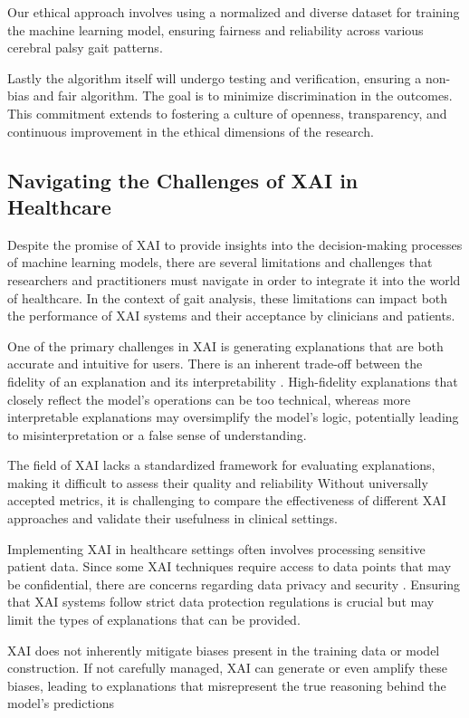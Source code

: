 \documentclass[UKenglish]{uiomasterthesis}
\begin{document}
Our ethical approach involves using a normalized and diverse dataset for training the machine learning model, ensuring fairness and reliability across various cerebral palsy gait patterns.

Lastly the algorithm itself will undergo testing and verification, ensuring a non-bias and fair algorithm. The goal is to minimize discrimination in the outcomes. This commitment extends to fostering a culture of openness, transparency, and continuous improvement in the ethical dimensions of the research.

\subsection{Navigating the Challenges of XAI in Healthcare}
Despite the promise of XAI to provide insights into the decision-making processes of machine learning models, there are several limitations and challenges that researchers and practitioners must navigate in order to integrate it into the world of healthcare. In the context of gait analysis, these limitations can impact both the performance of XAI systems and their acceptance by clinicians and patients.

One of the primary challenges in XAI is generating explanations that are both accurate and intuitive for users. There is an inherent trade-off between the fidelity of an explanation and its interpretability \cite{holzinger_causability_2019}. High-fidelity explanations that closely reflect the model's operations can be too technical, whereas more interpretable explanations may oversimplify the model's logic, potentially leading to misinterpretation or a false sense of understanding.

The field of XAI lacks a standardized framework for evaluating explanations, making it difficult to assess their quality and reliability \cite{liu_tensors_2022} Without universally accepted metrics, it is challenging to compare the effectiveness of different XAI approaches and validate their usefulness in clinical settings.

Implementing XAI in healthcare settings often involves processing sensitive patient data. Since some XAI techniques require access to data points that may be confidential, there are concerns regarding data privacy and security \cite{martinez-martin_ethics_2020}. Ensuring that XAI systems follow strict data protection regulations is crucial but may limit the types of explanations that can be provided.

XAI does not inherently mitigate biases present in the training data or model construction. If not carefully managed, XAI can generate or even amplify these biases, leading to explanations that misrepresent the true reasoning behind the model's predictions \cite{chakraborty_bias_2021}
\end{document}
